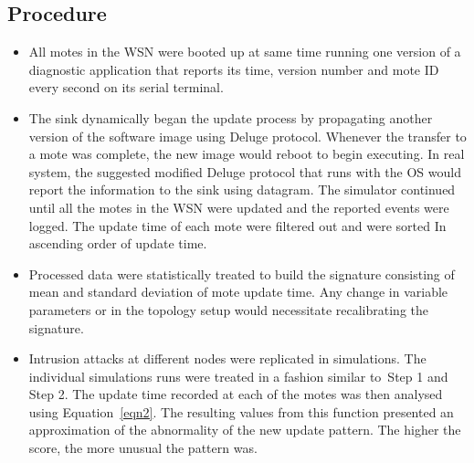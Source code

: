 \documentclass{CRPITStyle}
\begin{document}
\subsection*{Procedure}
\label{subsec:proc}

\begin{itemize}
\item All motes in the WSN were booted up at same time running one version of a diagnostic application that reports its time, version number and mote ID every second on its serial terminal. 
\item The sink dynamically began the update process by propagating another version of the software image using Deluge protocol. %
Whenever the transfer to a mote was complete, the new image would  reboot to begin executing.
In real system, the suggested modified Deluge protocol that runs with the OS would report the information to the sink using datagram.
The simulator continued until all the motes in the WSN were updated and the reported events were logged. 
The update time of each mote were filtered out  and were sorted In ascending order of update time.
\item Processed data  were statistically treated to build the signature consisting of mean and standard deviation of  mote update time.
Any change in variable parameters or in the topology setup would necessitate recalibrating the signature.
\item Intrusion attacks at different nodes were replicated in simulations.
The individual simulations runs were treated in a fashion  similar to~Step 1 and Step 2.
The update time recorded at each of the motes was then analysed using Equation~\ref{eqn2}.
The resulting values from this function presented an approximation of the abnormality of the new update pattern. The higher the score, the more unusual the pattern was. 

\end{itemize}
\end{document}
